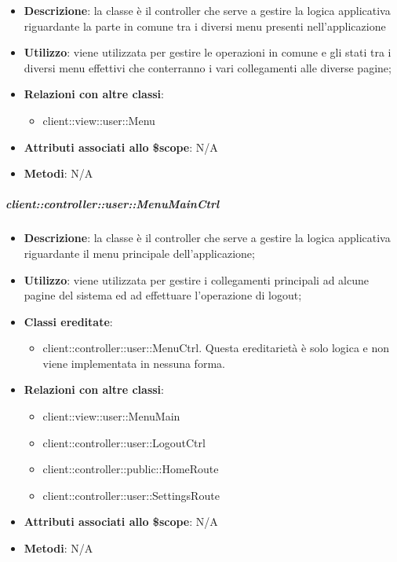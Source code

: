 			\begin{itemize}
				\item \textbf{Descrizione}: la classe è il controller che serve a gestire la logica applicativa riguardante la parte in comune tra i diversi menu presenti nell'applicazione
				\item \textbf{Utilizzo}: viene utilizzata per gestire le operazioni in comune e gli stati tra i diversi menu effettivi che conterranno i vari collegamenti alle diverse pagine;
				\item \textbf{Relazioni con altre classi}:
					\begin{itemize}
						\item client::view::user::Menu
					\end{itemize}
				\item \textbf{Attributi associati allo \$scope}: N/A
				\item \textbf{Metodi}: N/A
			\end{itemize}

		\subparagraph{client::controller::user::MenuMainCtrl} %
		\label{subp:client_controller_user_menumainctrl}

			\begin{itemize}
				\item \textbf{Descrizione}: la classe è il controller che serve a gestire la logica applicativa riguardante il menu principale dell'applicazione;
				\item \textbf{Utilizzo}: viene utilizzata per gestire i collegamenti principali ad alcune pagine del sistema ed ad effettuare l'operazione di logout;
				\item \textbf{Classi ereditate}:
					\begin{itemize}
						\item client::controller::user::MenuCtrl. Questa ereditarietà è solo logica e non viene implementata in nessuna forma.
					\end{itemize}
				\item \textbf{Relazioni con altre classi}:
					\begin{itemize}
						\item client::view::user::MenuMain
						\item client::controller::user::LogoutCtrl
						\item client::controller::public::HomeRoute
						\item client::controller::user::SettingsRoute
					\end{itemize}
				\item \textbf{Attributi associati allo \$scope}: N/A
				\item \textbf{Metodi}: N/A
			\end{itemize}

